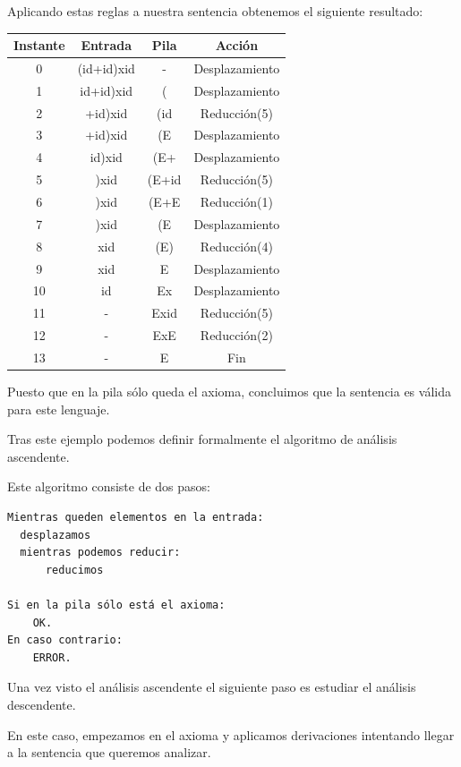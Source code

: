 \documentclass{apuntes}
\begin{document}
\begin{example}
Aplicando estas reglas a nuestra sentencia obtenemos el siguiente resultado:
\begin{center}
\begin{tabular}{| c | c | c | c |}
\hline
Instante & Entrada & Pila & Acción \\
\hline
0 & (id+id)xid & - & Desplazamiento \\
\hline
1 & id+id)xid & ( & Desplazamiento \\
\hline
2 & +id)xid & (id & Reducción(5) \\
\hline
3 & +id)xid & (E & Desplazamiento \\
\hline
4 & id)xid & (E+ & Desplazamiento \\
\hline
5 & )xid & (E+id & Reducción(5)\\
\hline
6 & )xid & (E+E & Reducción(1) \\
\hline
7 & )xid & (E & Desplazamiento \\
\hline
8 & xid & (E) & Reducción(4) \\
\hline
9 & xid & E & Desplazamiento \\
\hline
10 & id & Ex & Desplazamiento \\
\hline
11 & - & Exid & Reducción(5) \\
\hline
12 & - & ExE & Reducción(2) \\
\hline
13 & - & E & Fin \\
\hline
\end{tabular}
\end{center}
Puesto que en la pila sólo queda el axioma, concluimos que la sentencia es válida para este lenguaje.
\end{example}

Tras este ejemplo podemos definir formalmente el algoritmo de análisis ascendente.

\begin{defn}
Este algoritmo consiste de dos pasos:
\begin{verbatim}
Mientras queden elementos en la entrada:
  desplazamos
  mientras podemos reducir:
      reducimos

Si en la pila sólo está el axioma:
    OK.
En caso contrario:
    ERROR.
\end{verbatim}
\end{defn}

Una vez visto el análisis ascendente el siguiente paso es estudiar el análisis descendente.

En este caso, empezamos en el axioma y aplicamos derivaciones intentando llegar a la sentencia que queremos analizar.
\end{document}
